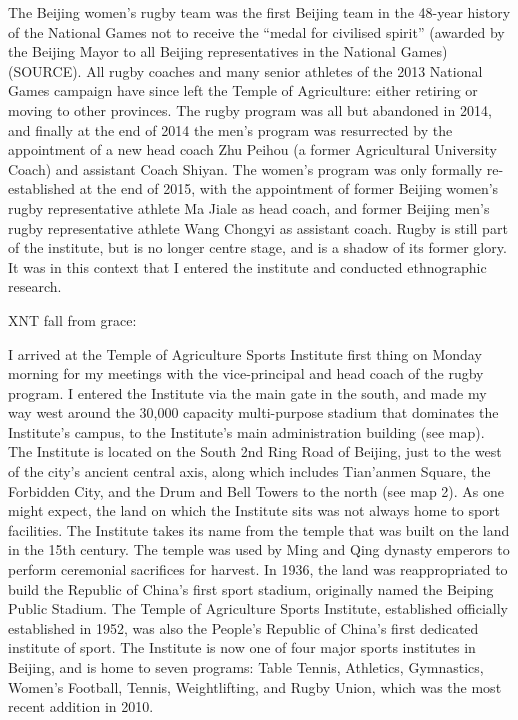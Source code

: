 The Beijing women's rugby team was the first Beijing team in the 48-year history of the National Games not to receive the ``medal for civilised spirit''  (awarded by the Beijing Mayor to all Beijing representatives in the National Games) (SOURCE).  All rugby coaches and many senior athletes of the 2013 National Games campaign have since left the Temple of Agriculture: either retiring or moving to other provinces.  The rugby program was all but abandoned in 2014, and finally at the end of 2014 the men's program was resurrected by the appointment of a new head coach Zhu Peihou (a former Agricultural University Coach) and assistant Coach Shiyan.  The women's program was only formally re-established at the end of 2015, with the appointment of former Beijing women's rugby representative athlete Ma Jiale as head coach, and former Beijing men's rugby representative athlete Wang Chongyi as assistant coach.  Rugby is still part of the institute, but is no longer centre stage, and is a shadow of its former glory.  It was in this context that I entered the institute and conducted ethnographic research.


XNT fall from grace:

I arrived at the Temple of Agriculture Sports Institute first thing on Monday morning for my meetings with the vice-principal and head coach of the rugby program.  I entered the Institute via the main gate in the south, and made my way west around the 30,000 capacity multi-purpose stadium that dominates the Institute's campus, to the Institute's main administration building (see map).  The Institute is located on the South 2nd Ring Road of Beijing, just to the west of the city's ancient central axis, along which includes Tian'anmen Square, the Forbidden City, and the Drum and Bell Towers to the north (see map 2). As one might expect, the land on which the Institute sits was not always home to sport facilities.  The Institute takes its name from the temple that was built on the land in the 15th century.  The temple was used by Ming and Qing dynasty emperors to perform ceremonial sacrifices for harvest. In 1936, the land was reappropriated to build the Republic of China's first sport stadium, originally named the Beiping Public Stadium. The Temple of Agriculture Sports Institute, established officially established in 1952, was also the People's Republic of China's first dedicated institute of sport.  The Institute is now one of four major sports institutes in Beijing, and is home to seven programs: Table Tennis, Athletics, Gymnastics, Women's Football, Tennis, Weightlifting, and Rugby Union, which was the most recent addition in 2010.

